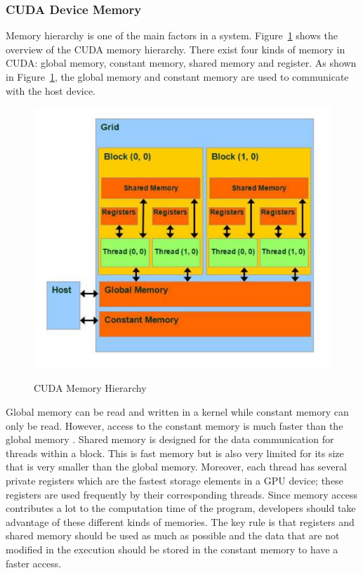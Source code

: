 \documentclass[Ingles]{ic-tese-v1}
\newcommand{\rfig}[1]{Figure~\ref{fig:#1}}
\begin{document}
\newpage
\subsubsection{CUDA Device Memory}
\label{CUDA Device Memory}
Memory hierarchy is one of the main factors in a system. \rfig{cudamemory} shows the overview of the CUDA memory hierarchy. There exist
four kinds of memory in CUDA: global memory, constant memory, shared memory and register. As shown in \rfig{cudamemory}, the global memory and constant memory are used to communicate with the host device.\\

\begin{figure}[t]
	\caption{CUDA Memory Hierarchy}
	\centering
	\includegraphics[scale=0.70]{images/cuda_memory.png}
	\label{fig:cudamemory}
\end{figure}

Global memory can be read and written in a kernel while constant memory can only be
read. However, access to the constant memory is much faster than the global memory . Shared memory is designed for the data communication for
threads within a block. This is fast memory but is also very limited for its size that is very smaller than the global memory. Moreover, each thread has several private registers which are the fastest storage elements in a GPU device; these registers are used   frequently by their corresponding threads. Since memory access contributes a lot to the computation time of the program, developers should take advantage of these different kinds of memories. The key rule is that registers and shared memory should be used as much as possible and the data that are not modified in the execution should be stored in the constant memory to have a faster access.
\end{document}
